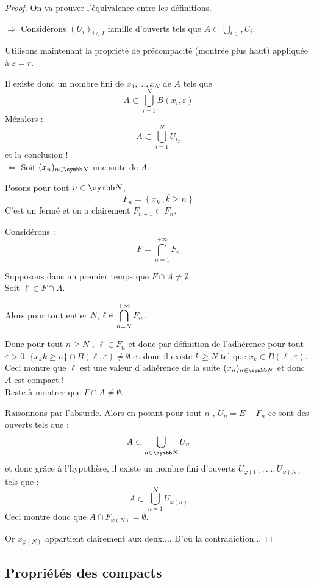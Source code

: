\begin{proof}
On va prouver l'équivalence entre les définitions. 

$\Rightarrow$ Considérons  $(U_i)_{i \in I}$ famille d'ouverts tels que $A \subset \bigcup_{i \in I} U_i$.

Utilisons maintenant la propriété de précompacité (montrée plus haut) appliquée à $\varepsilon=r$.

Il existe donc un nombre fini de $x_1,...,x_N$ de $A$ tels que
\[A \subset \bigcup_{i=1}^N B(x_i,\varepsilon)\]
Mézalors :
\[A \subset \bigcup_{i=1}^N U_{i_x}\]
et la conclusion ! \\

$\Leftarrow$ Soit $(x_n)_{n \in \N}$ une suite de $A$.

Posons pour tout $n \in \N$, 
\[F_n=\overline{ \left\{x_k \ , k \geq n\right\} }\]
C'est un fermé et on a clairement $F_{n+1} \subset F_n$.

Considérons : \[F=\bigcap_{n=1}^{+ \infty} F_n\]

Supposons dans un premier temps que $F \cap A \neq \emptyset$.\\

Soit $\ell \in F \cap A$.

Alors pour tout entier $N$, $\displaystyle \ell \in \bigcap_{n=N}^{+\infty} F_n$.

Donc pour tout $n\geq N$ , $\ell \in F_n$ et donc par définition de l'adhérence  pour tout $\varepsilon>0$, $\{x_k k\geqslant n\} \cap B(\ell, \varepsilon) \neq \emptyset$
et donc il existe $k\geqslant N$ tel que $x_k \in  B(\ell, \varepsilon) $.\\
Ceci montre que $\ell$ est une valeur d'adh\'erence de la suite $(x_n)_{n \in \N}$ et donc $A$ est compact !\\

Reste à montrer que $F \cap A \neq \emptyset$.

Raisonnons par l'absurde.
Alors en posant pour tout $n$ , $U_n=E-F_n$ ce sont des ouverts tels que :
\[A \subset \bigcup_{n\in \N} U_n\]
et donc grâce à l'hypothèse, il existe un nombre fini d'ouverts $U_{\varphi(1)},...,U_{\varphi(N)}$ tels que :
\[A \subset \bigcup_{n=1}^N U_{\varphi(n)}\]
Ceci montre donc que $A \cap F_{\varphi(N)}=\emptyset$.

Or $x_{\varphi(N)}$ appartient clairement aux deux.... D'où la contradiction...
\end{proof}

\subsection{Propriétés des compacts}

